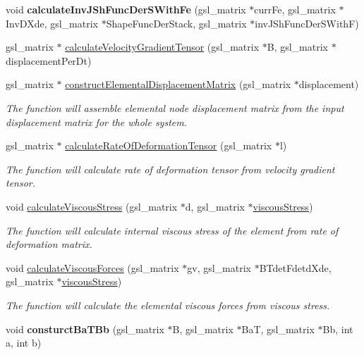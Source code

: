 \begin{DoxyCompactItemize}
\item 
\hypertarget{classShapeBase_a8d984ddba5bbeae91cb3180897a5a3e7}{}void {\bfseries calculate\+Inv\+J\+Sh\+Func\+Der\+S\+With\+Fe} (gsl\+\_\+matrix $\ast$curr\+Fe, gsl\+\_\+matrix $\ast$Inv\+D\+Xde, gsl\+\_\+matrix $\ast$Shape\+Func\+Der\+Stack, gsl\+\_\+matrix $\ast$inv\+J\+Sh\+Func\+Der\+S\+With\+F)\label{classShapeBase_a8d984ddba5bbeae91cb3180897a5a3e7}

\item 
gsl\+\_\+matrix $\ast$ \hyperlink{classShapeBase_aafb0d14adc7ac116191bcff4a7837e98}{calculate\+Velocity\+Gradient\+Tensor} (gsl\+\_\+matrix $\ast$B, gsl\+\_\+matrix $\ast$displacement\+Per\+Dt)
\item 
gsl\+\_\+matrix $\ast$ \hyperlink{classShapeBase_afcdbbe37a746ade52a1af70a9aa12b9f}{construct\+Elemental\+Displacement\+Matrix} (gsl\+\_\+matrix $\ast$displacement)
\begin{DoxyCompactList}\small\item\em The function will assemble elemental node displacement matrix from the input displacement matrix for the whole system. \end{DoxyCompactList}\item 
gsl\+\_\+matrix $\ast$ \hyperlink{classShapeBase_afbbf191777e8787a0e8307d30ce0aa9d}{calculate\+Rate\+Of\+Deformation\+Tensor} (gsl\+\_\+matrix $\ast$l)
\begin{DoxyCompactList}\small\item\em The function will calculate rate of deformation tensor from velocity gradient tensor. \end{DoxyCompactList}\item 
void \hyperlink{classShapeBase_a22ffae25fafb0fa584a3a4d0196af7aa}{calculate\+Viscous\+Stress} (gsl\+\_\+matrix $\ast$d, gsl\+\_\+matrix $\ast$\hyperlink{classShapeBase_a95733061efc2a6645fecfe5c0aa1dd93}{viscous\+Stress})
\begin{DoxyCompactList}\small\item\em The function will calculate internal viscous stress of the element from rate of deformation matrix. \end{DoxyCompactList}\item 
void \hyperlink{classShapeBase_a4d10225f251fa1bd8a2e6ffc8feb5326}{calculate\+Viscous\+Forces} (gsl\+\_\+matrix $\ast$gv, gsl\+\_\+matrix $\ast$B\+Tdet\+Fdetd\+Xde, gsl\+\_\+matrix $\ast$\hyperlink{classShapeBase_a95733061efc2a6645fecfe5c0aa1dd93}{viscous\+Stress})
\begin{DoxyCompactList}\small\item\em The function will calculate the elemental viscous forces from viscous stress. \end{DoxyCompactList}\item 
\hypertarget{classShapeBase_a7ae9fb15fa6e3f99173841ea910710c1}{}void {\bfseries consturct\+Ba\+T\+Bb} (gsl\+\_\+matrix $\ast$B, gsl\+\_\+matrix $\ast$Ba\+T, gsl\+\_\+matrix $\ast$Bb, int a, int b)\label{classShapeBase_a7ae9fb15fa6e3f99173841ea910710c1}


\end{DoxyCompactItemize}
